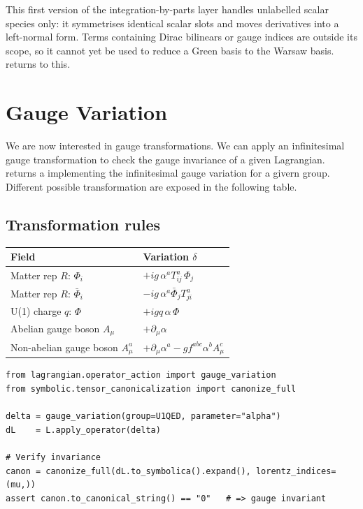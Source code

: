 \begin{tcolorbox}[warnbox, title={Scope of the current implementation}]
This first version of the integration-by-parts layer handles unlabelled scalar species only: it symmetrises identical scalar slots and moves derivatives into a left-normal form. Terms containing Dirac bilinears or gauge indices are outside its scope, so it cannot yet be used to reduce a Green basis to the Warsaw basis.  returns to
this.
\end{tcolorbox}


\section{Gauge Variation}
\label{sec:feynpy-gauge-variation}

We are now interested in gauge transformations. We can apply an infinitesimal gauge transformation to check the gauge invariance of a given Lagrangian.  returns a  implementing the infinitesimal gauge variation for a givern group. Different possible transformation are exposed in the following table.


\subsection*{Transformation rules}

\begin{center}
\begin{tabular}{@{}p{5cm}p{8cm}@{}}
\toprule
\textbf{Field} & \textbf{Variation $\delta$} \\
\midrule
Matter rep $R$: $\Phi_i$           & $+ig\,\alpha^a T^a_{ij}\,\Phi_j$ \\
Matter rep $R$: $\bar\Phi_i$        & $-ig\,\alpha^a \bar\Phi_j T^a_{ji}$ \\
U(1) charge $q$: $\Phi$            & $+igq\,\alpha\,\Phi$ \\
Abelian gauge boson $A_\mu$         & $+\partial_\mu\alpha$ \\
Non-abelian gauge boson $A^a_\mu$   & $+\partial_\mu\alpha^a - g f^{abc}\alpha^b A^c_\mu$ \\
\bottomrule
\end{tabular}
\end{center}

\begin{verbatim}
from lagrangian.operator_action import gauge_variation
from symbolic.tensor_canonicalization import canonize_full

delta = gauge_variation(group=U1QED, parameter="alpha")
dL    = L.apply_operator(delta)

# Verify invariance
canon = canonize_full(dL.to_symbolica().expand(), lorentz_indices=(mu,))
assert canon.to_canonical_string() == "0"   # => gauge invariant
\end{verbatim}

